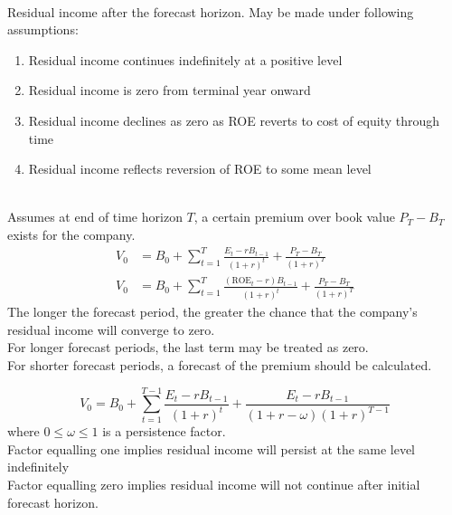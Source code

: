 \begin{method} \\
Residual income after the forecast horizon. May be made under following assumptions:
\begin{enumerate}[label=\roman*.]
\setlength{\itemsep}{0pt}
\item Residual income continues indefinitely at a positive level
\item Residual income is zero from terminal year onward
\item Residual income declines as zero as ROE reverts to cost of equity through time
\item Residual income reflects reversion of ROE to some mean level
\end{enumerate}
\end{method}

\begin{method} \\
Assumes at end of time horizon $T$, a certain premium over book value $P_T - B_T$ exists for the company.
\begin{align}
V_0 &= B_0 + \sum\limits_{t=1}^{T} \frac{E_t - r B_{t-1}}{(1+r)^t} + \frac{P_T - B_T}{(1+r)^T} \nonumber \\
V_0 &= B_0 + \sum\limits_{t=1}^{T} \frac{(\text{ROE}_t - r) B_{t-1}}{(1+r)^t} + \frac{P_T - B_T}{(1+r)^T} \nonumber
\end{align}
The longer the forecast period, the greater the chance that the company's residual income will converge to zero.\\
For longer forecast periods, the last term may be treated as zero.\\
For shorter forecast periods, a forecast of the premium should be calculated.
\end{method}

\begin{method} 
\begin{equation}
V_0 = B_0 + \sum\limits_{t=1}^{T-1} \frac{E_t - r B_{t-1}}{(1+r)^t} + \frac{E_t - r B_{t-1}}{(1+r-\omega)(1+r)^{T-1}} \nonumber
\end{equation}
where $0 \leq \omega \leq 1$ is a persistence factor.\\
Factor equalling one implies residual income will persist at the same level indefinitely\\
Factor equalling zero implies residual income will not continue after initial forecast horizon.
\end{method}

